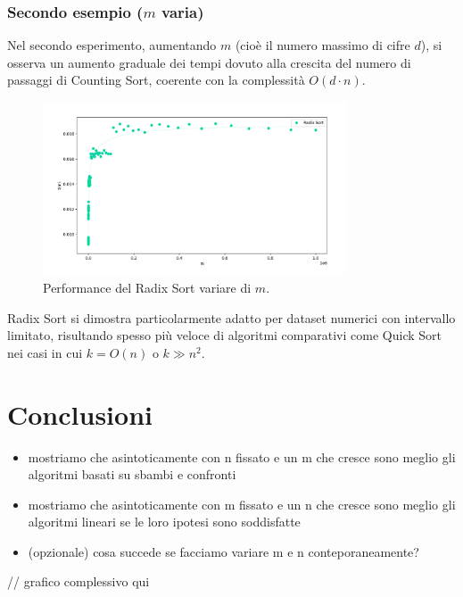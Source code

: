 \documentclass[a4paper, 12pt, oneside]{book}
\begin{document}
\subsection{Secondo esempio ($m$ varia)}

Nel secondo esperimento, aumentando \(m\) (cioè il numero massimo di cifre \(d\)), si osserva un aumento graduale dei tempi dovuto alla crescita del numero di passaggi di Counting Sort, coerente con la complessità \(O(d \cdot n)\).

\begin{figure}[H]
    \centering
    \includegraphics[width=0.8\textwidth]{images/grafico_radix_sort_m.png}
    \caption{Performance del Radix Sort variare di \(m\).}
    \label{fig:radix_sort_3_way_m}
\end{figure}

\noindent Radix Sort si dimostra particolarmente adatto per dataset numerici con intervallo limitato, risultando spesso più veloce di algoritmi comparativi come Quick Sort nei casi in cui \(k = O(n)\) o \(k \gg n^2\).


\chapter{Conclusioni}\label{chap:Conclusioni} %


\begin{itemize}
    \item mostriamo che asintoticamente con n fissato e un m che cresce sono meglio gli algoritmi basati su sbambi e confronti
    \item mostriamo che asintoticamente con m fissato e un n che cresce sono meglio gli algoritmi lineari se le loro ipotesi sono soddisfatte
    \item (opzionale) cosa succede se facciamo variare m e n conteporaneamente?
\end{itemize}

// grafico complessivo qui

\end{document}
